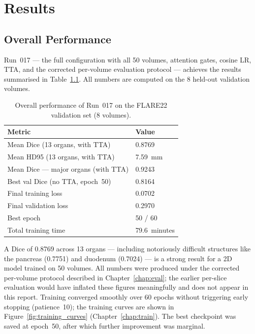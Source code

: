 \chapter{Results}
\label{chap:results}

\section{Overall Performance}

Run~017 --- the full configuration with all 50 volumes, attention gates, cosine LR, TTA, and the corrected per-volume evaluation protocol --- achieves the results summarised in Table~\ref{tab:overall_results}. All numbers are computed on the 8 held-out validation volumes.

\begin{table}[h!]
\centering
\caption{Overall performance of Run~017 on the FLARE22 validation set (8 volumes).}
\label{tab:overall_results}
\begin{tabular}{ll}
\toprule
\textbf{Metric} & \textbf{Value} \\
\midrule
Mean Dice (13 organs, with TTA)       & 0.8769 \\
Mean HD95 (13 organs, with TTA)       & 7.59~mm \\
Mean Dice --- major organs (with TTA) & 0.9243 \\
Best val Dice (no TTA, epoch~50)      & 0.8164 \\
Final training loss                   & 0.0702 \\
Final validation loss                 & 0.2970 \\
Best epoch                            & 50 / 60 \\
Total training time                   & 79.6~minutes \\
\bottomrule
\end{tabular}
\end{table}

A Dice of 0.8769 across 13 organs --- including notoriously difficult structures like the pancreas (0.7751) and duodenum (0.7024) --- is a strong result for a 2D model trained on 50 volumes. All numbers were produced under the corrected per-volume protocol described in Chapter~\ref{chap:eval}; the earlier per-slice evaluation would have inflated these figures meaningfully and does not appear in this report. Training converged smoothly over 60 epochs without triggering early stopping (patience~10); the training curves are shown in Figure~\ref{fig:training_curves} (Chapter~\ref{chap:train}). The best checkpoint was saved at epoch~50, after which further improvement was marginal.

